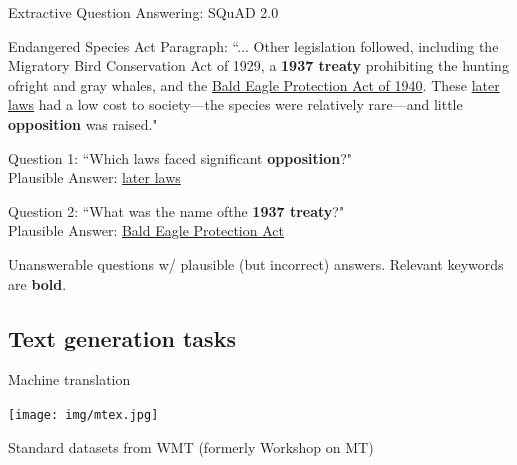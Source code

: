 \documentclass[12pt,aspectratio=169,handout]{beamer}
\begin{document}
\begin{frame}{Extractive Question Answering: SQuAD 2.0}
	
\begin{footnotesize}
\begin{example}
Endangered Species Act Paragraph: ``... Other legislation followed, including the Migratory Bird Conservation Act of 1929, a \textbf{1937 treaty} prohibiting the hunting ofright and gray whales, and the \underline{Bald Eagle Protection Act of 1940}. These \underline{later laws} had a low cost to society---the species were relatively rare---and little \textbf{opposition} was raised."

Question 1: ``Which laws faced significant \textbf{opposition}?" \\
Plausible Answer: \underline{later laws}

Question 2: ``What was the name ofthe \textbf{1937 treaty}?" \\
Plausible Answer: \underline{Bald Eagle Protection Act}
\end{example}
\end{footnotesize}

Unanswerable questions w/ plausible (but incorrect) answers. Relevant keywords are \textbf{bold}.

	
	
\end{frame}


\subsection{Text generation tasks}


\begin{frame}{Machine translation}

\texttt{[image: img/mtex.jpg]}

Standard datasets from WMT (formerly Workshop on MT)



\end{frame}
\end{document}
